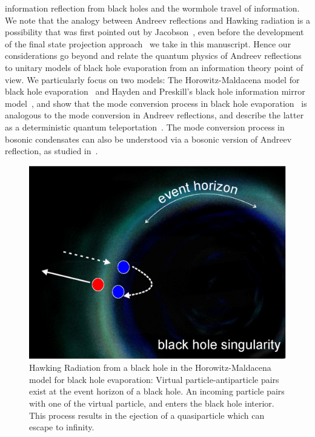 \documentclass[12pt,letterpaper,aps,onecolumn,superscriptaddress,floatfix,notitlepage]{revtex4-1}
\begin{document}
	information reflection from black holes and the wormhole travel of information. We note that the analogy between Andreev reflections and Hawking radiation is a possibility that was first pointed out by Jacobson~\cite{bhmodes}, even before the development of the final state projection approach~\cite{projection,horowitz} we take in this manuscript. Hence our considerations go beyond and relate the quantum physics of Andreev reflections to unitary models of black hole evaporation from an information theory point of view. We particularly focus on two models: The Horowitz-Maldacena model for black hole evaporation~\cite{horowitz} and Hayden and Preskill's black hole information mirror model~\cite{preskill}, and show that the mode conversion process in black hole evaporation~\cite{bhmodes,horowitz,preskill} is analogous to the mode conversion in Andreev reflections, and describe the latter as a deterministic quantum teleportation~\cite{CTC}. The mode conversion process in bosonic condensates can also be understood via a bosonic version of Andreev reflection, as studied in~\cite{zapata2011resonant,zapata2009andreev}.
	\begin{figure}
		\includegraphics[scale=0.5]{fig1.eps}
		\caption{Hawking Radiation from a black hole in the Horowitz-Maldacena model for black hole evaporation: Virtual particle-antiparticle pairs exist at the event horizon of a black hole.  An incoming particle pairs with one of the virtual particle, and enters the black hole interior.  This process results in the ejection of a quasiparticle which can escape to infinity.\label{cosmos}}
	\end{figure}
	
\end{document}
